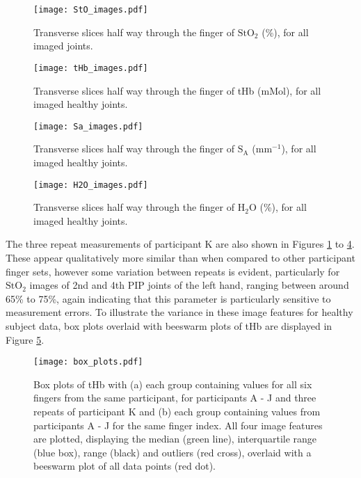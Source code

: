 \documentclass[twoside]{bhamthesis}
\theoremstyle{definition}
\begin{document}
\begin{figure}[!ht]
\centering\texttt{[image: StO\_images.pdf]}
\caption{Transverse slices half way through the finger of $\mathrm{StO_2}$ (\%), for all imaged joints.}
\label{fig1}
\end{figure}

\begin{figure}[!ht]
\centering\texttt{[image: tHb\_images.pdf]}
\caption{Transverse slices half way through the finger of tHb (mMol), for all imaged healthy joints.}
\label{fig2}
\end{figure}

\begin{figure}[!ht]
\centering\texttt{[image: Sa\_images.pdf]}
\caption{Transverse slices half way through the finger of $\mathrm{S_A}$ (mm$^{-1}$), for all imaged healthy joints.}
\label{fig3}
\end{figure}

\begin{figure}[!ht]
\centering\texttt{[image: H2O\_images.pdf]}
\caption{Transverse slices half way through the finger of $\mathrm{H_2O}$ (\%), for all imaged healthy joints.}
\label{fig4}
\end{figure}

The three repeat measurements of participant K are also shown in Figures \ref{fig1} to \ref{fig4}. These appear qualitatively more similar than when compared to other participant finger sets, however some variation between repeats is evident, particularly for $\mathrm{StO_2}$ images of 2nd and 4th PIP joints of the left hand, ranging between around 65\% to 75\%, again indicating that this parameter is particularly sensitive to measurement errors. To illustrate the variance in these image features for healthy subject data, box plots overlaid with beeswarm plots of tHb are displayed in Figure \ref{box_plots}.

\begin{figure}[!ht]
\centering\texttt{[image: box\_plots.pdf]}
\caption{Box plots of tHb with (a) each group containing values for all six fingers from the same participant, for participants A - J and three repeats of participant K and (b) each group containing values from participants A - J for the same finger index. All four image features are plotted, displaying the median (green line), interquartile range (blue box), range (black) and outliers (red cross), overlaid with a beeswarm plot of all data points (red dot).}
\label{box_plots}
\end{figure}
\end{document}
